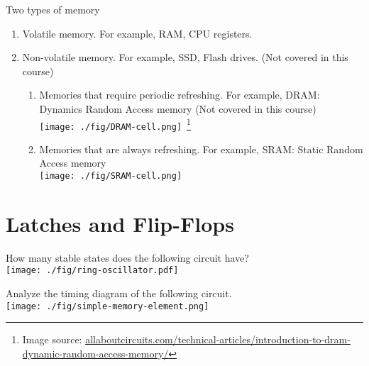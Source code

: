 Two types of memory
\begin{enumerate}
  \item Volatile memory. For example, RAM, CPU registers.
  \item Non-volatile memory. For example, SSD, Flash drives. (Not covered in this course)
    \begin{enumerate}
    \item Memories that require periodic refreshing. For example, DRAM: Dynamics Random Access memory (Not covered in this course)\\
      \texttt{[image: ./fig/DRAM-cell.png]}~\footnote{Image
        source: \url{allaboutcircuits.com/technical-articles/introduction-to-dram-dynamic-random-access-memory/}}
    \item Memories that are always refreshing. For example, SRAM: Static Random
      Access memory~\cite[Appendix~B.64]{stephen2022fundamentals}\\
      \texttt{[image: ./fig/SRAM-cell.png]}
    \end{enumerate}
\end{enumerate}

\section{Latches and Flip-Flops \cite[Sec~3.2]{harris2022digital}}

\begin{example} \cite[Sec~3.31]{harris2022digital}
  How many stable states does the following circuit have?\\
  \texttt{[image: ./fig/ring-oscillator.pdf]} 
\end{example}
\vspace{10em}

\begin{definition}
\end{definition}
\vspace{5em}


\begin{example}
  Analyze the timing diagram of the following circuit.\\
  \texttt{[image: ./fig/simple-memory-element.png]}
\end{example}
\vspace{10em}

\begin{definition}
\end{definition}
\vspace{5em}

